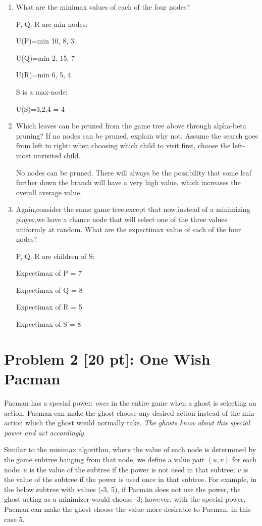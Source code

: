 \documentclass[12pt]{article}
\theoremstyle{case}
\begin{document}
    
\begin{enumerate} [label=(\alph*)]
    \item
    What are the minimax values of each of the four nodes?
    
P, Q, R are min-nodes:

        U(P)=min {10, 8, 3}

        U(Q)=min {2, 15, 7}

        U(R)=min {6, 5, 4}

S is a max-node:

  U(S)={3,2,4} = 4






    \item
    Which leaves can be pruned from the game tree above through alpha-beta pruning? If no nodes can be pruned, explain why not. Assume the search goes from left to right: when choosing which child to visit first, choose the left-most unvisited child.
   
No nodes can be pruned. There will always be the possibility that some leaf further down the branch will have a very high value, which increases the overall average value.
    
    \item 
    Again,consider the same game tree,except that now,instead of a minimizing player,we have a chance node that will select one of the three values uniformly at random. What are the expectimax value of each of the four nodes?
   
P, Q, R are children of S:

        Expectimax of P = 7

        Expectimax of Q = 8

        Expectimax of R = 5

        Expectimax of S = 8

\end{enumerate}

\newpage
\section*{Problem 2 [20 pt]: One Wish Pacman}
Pacman has a special power: {\em once} in the entire game when a ghost is selecting an action, Pacman can make the ghost choose any desired action instead of the min-action which the ghost would normally take. {\em The ghosts know about this special power and act accordingly.}

Similar to the minimax algorithm, where the value of each node is determined by the game subtree hanging from that node, we define a value pair $(u,v)$ for each node: $u$ is the value of the subtree if the power is not used in that subtree; $v$ is the value of the subtree if the power is used once in that subtree. For example, in the below subtree with values (-3, 5), if Pacman does not use the power, the ghost acting as a minimizer would choose -3; however, with the special power, Pacman can make the ghost choose the value more desirable to Pacman, in this case 5.
\end{document}
